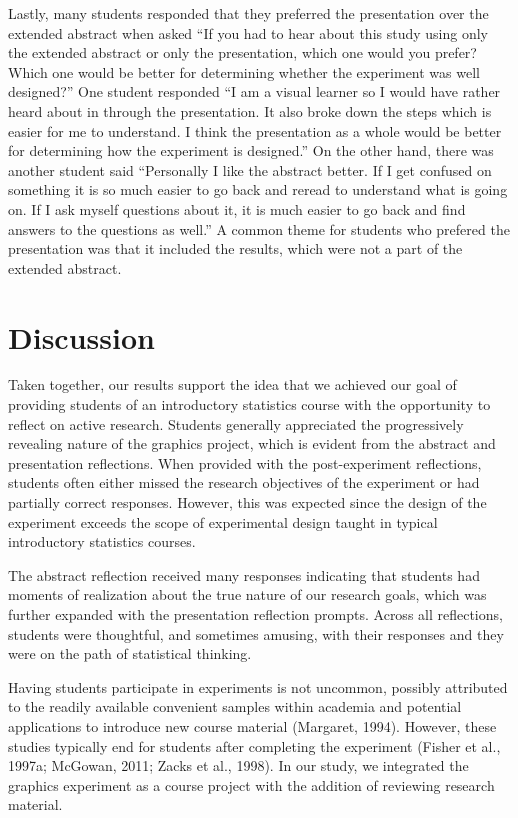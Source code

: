 \documentclass[phd]{nuthesis}
\begin{document}
Lastly, many students responded that they preferred the presentation
over the extended abstract when asked ``If you had to hear about this
study using only the extended abstract or only the presentation, which
one would you prefer? Which one would be better for determining whether
the experiment was well designed?'' One student responded ``I am a
visual learner so I would have rather heard about in through the
presentation. It also broke down the steps which is easier for me to
understand. I think the presentation as a whole would be better for
determining how the experiment is designed.'' On the other hand, there
was another student said ``Personally I like the abstract better. If I
get confused on something it is so much easier to go back and reread to
understand what is going on. If I ask myself questions about it, it is
much easier to go back and find answers to the questions as well.'' A
common theme for students who prefered the presentation was that it
included the results, which were not a part of the extended abstract.

\section{Discussion}\label{discussion}

Taken together, our results support the idea that we achieved our goal
of providing students of an introductory statistics course with the
opportunity to reflect on active research. Students generally
appreciated the progressively revealing nature of the graphics project,
which is evident from the abstract and presentation reflections. When
provided with the post-experiment reflections, students often either
missed the research objectives of the experiment or had partially
correct responses. However, this was expected since the design of the
experiment exceeds the scope of experimental design taught in typical
introductory statistics courses.

The abstract reflection received many responses indicating that students
had moments of realization about the true nature of our research goals,
which was further expanded with the presentation reflection prompts.
Across all reflections, students were thoughtful, and sometimes amusing,
with their responses and they were on the path of statistical thinking.

Having students participate in experiments is not uncommon, possibly
attributed to the readily available convenient samples within academia
and potential applications to introduce new course material (Margaret,
1994). However, these studies typically end for students after
completing the experiment (Fisher et al., 1997a; McGowan, 2011; Zacks et
al., 1998). In our study, we integrated the graphics experiment as a
course project with the addition of reviewing research material.
\end{document}
